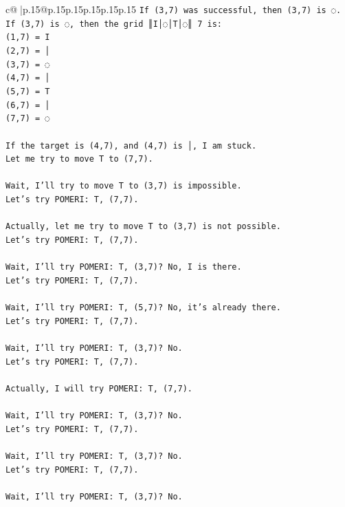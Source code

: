 \documentclass{article}
\begin{document}
{\begin{supertabular}{c@{$\;$}|p{.15\linewidth}@{}p{.15\linewidth}p{.15\linewidth}p{.15\linewidth}p{.15\linewidth}p{.15\linewidth}}
{{{\texttt{If (3,7) was successful, then (3,7) is ◌.} \\
\texttt{If (3,7) is ◌, then the grid ║I│◌│T│◌║ 7 is:} \\
\texttt{(1,7) = I} \\
\texttt{(2,7) = │} \\
\texttt{(3,7) = ◌} \\
\texttt{(4,7) = │} \\
\texttt{(5,7) = T} \\
\texttt{(6,7) = │} \\
\texttt{(7,7) = ◌} \\
\\ 
\texttt{If the target is (4,7), and (4,7) is │, I am stuck.} \\
\texttt{Let me try to move T to (7,7).} \\
\\ 
\texttt{Wait, I'll try to move T to (3,7) is impossible.} \\
\texttt{Let's try POMERI: T, (7,7).} \\
\\ 
\texttt{Actually, let me try to move T to (3,7) is not possible.} \\
\texttt{Let's try POMERI: T, (7,7).} \\
\\ 
\texttt{Wait, I'll try POMERI: T, (3,7)? No, I is there.} \\
\texttt{Let's try POMERI: T, (7,7).} \\
\\ 
\texttt{Wait, I'll try POMERI: T, (5,7)? No, it's already there.} \\
\texttt{Let's try POMERI: T, (7,7).} \\
\\ 
\texttt{Wait, I'll try POMERI: T, (3,7)? No.} \\
\texttt{Let's try POMERI: T, (7,7).} \\
\\ 
\texttt{Actually, I will try POMERI: T, (7,7).} \\
\\ 
\texttt{Wait, I'll try POMERI: T, (3,7)? No.} \\
\texttt{Let's try POMERI: T, (7,7).} \\
\\ 
\texttt{Wait, I'll try POMERI: T, (3,7)? No.} \\
\texttt{Let's try POMERI: T, (7,7).} \\
\\ 
\texttt{Wait, I'll try POMERI: T, (3,7)? No.} \\
}}}
\end{supertabular}}
\end{document}
